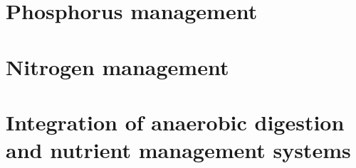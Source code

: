 \documentclass[ 
				twoside,
				openright,
				titlepage,numbers=noenddot,%
                headinclude,footinclude,cleardoublepage=empty,abstract=on,
                BCOR=5mm,paper=a4,fontsize=11pt
                ]{scrreprt}
\begin{document}
\frenchspacing
\raggedbottom
{} %
\pagestyle{plain}
%


\cleardoublepage
\cleardoublepage
\cleardoublepage
\cleardoublepage
\cleardoublepage
\cleardoublepage
\cleardoublepage
\pagestyle{scrheadings}



\cleardoublepage
{}
\part{Phosphorus management}\label{pt:Phosphorus}




\cleardoublepage
\part{Nitrogen management}\label{pt:Nitrogen}

\cleardoublepage
\part{Integration of anaerobic digestion and nutrient management systems}\label{pt:ADNutrientRec}


%
%
\appendix
\cleardoublepage
\end{document}
